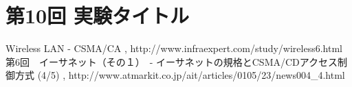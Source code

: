 \documentclass[a4j]{celb-report}
\begin{document}

\newpage
\section{第10回 実験タイトル}


\newpage
\begin{thebibliography}{9}
 Wireless LAN - CSMA/CA , http://www.infraexpert.com/study/wireless6.html
 第6回　イーサネット（その１）　- イーサネットの規格とCSMA/CDアクセス制御方式 (4/5) , http://www.atmarkit.co.jp/ait/articles/0105/23/news004\_4.html
\end{thebibliography}
%
\end{document}
